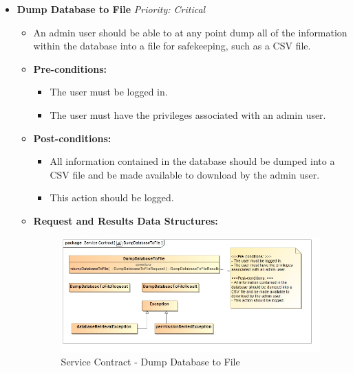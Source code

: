 \documentclass{article}
\begin{document}
\begin{itemize}
					\cleardoublepage
					\item \textbf{Dump Database to File} \hfill \textit{Priority: Critical}
					\begin{itemize}
						\item An admin user should be able to at any point dump all of the information within the database into a file for safekeeping, such as a CSV file.
						\item \textbf{Pre-conditions:}
						\begin{itemize}
							\item The user must be logged in.
							\item The user must have the privileges associated with an admin user.
						\end{itemize}
						\item \textbf{Post-conditions:}
						\begin{itemize}
							\item All information contained in the database should be dumped into a CSV file and be made available to download by the admin user.
							\item This action should be logged.
						\end{itemize}
						\item \textbf{Request and Results Data Structures:}
						\begin{figure}[H]
							\includegraphics[width=\linewidth]{../Diagrams/ServiceContracts/Reporting subsystem/DumpDatabaseToFile.jpg}
							\caption{Service Contract - Dump Database to File}
						\end{figure}
					\end{itemize}
				\end{itemize}
			
			\cleardoublepage
\end{document}
